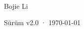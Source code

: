 \begin{titlepage}
\vfill
{\LARGE\sffamily Bojie Li\par}
\vspace{0.7cm}
{\small\sffamily\color{structurecolor!80} Sürüm v2.0 · \today\par}
\vspace{1.2cm}
\end{titlepage}
